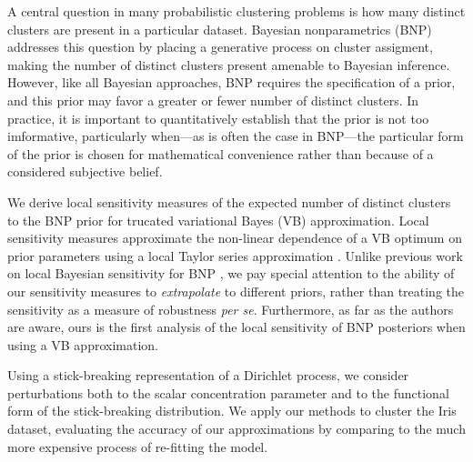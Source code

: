 
A central question in many probabilistic clustering problems is how many
distinct clusters are present in a particular dataset.
Bayesian nonparametrics (BNP) addresses this question by placing a generative
process on cluster assigment, making the number of distinct clusters present
amenable to Bayesian inference.  However, like all Bayesian approaches, BNP
requires the specification of a prior, and this prior may favor a greater or
fewer number of distinct clusters.
In practice, it is important to quantitatively establish that the prior is
not too imformative, particularly when---as is often the case in BNP---the
particular form of the prior is chosen for mathematical convenience rather than
because of a considered subjective belief.

We derive local sensitivity measures of the expected number of distinct clusters
to the BNP prior for trucated variational Bayes (VB) approximation.  Local
sensitivity measures approximate the non-linear dependence of a VB optimum on
prior parameters using a local Taylor series approximation
\citep{gustafson:1996:localposterior, giordano:2017:covariances}. Unlike
previous work on local Bayesian sensitivity for BNP
\citep{Basu:2000:BNP_robustness}, we pay special attention to the ability of our
sensitivity measures to \emph{extrapolate} to different priors, rather than
treating the sensitivity as a measure of robustness \textit{per se}.
Furthermore, as far as the authors are aware, ours is the first analysis of the
local sensitivity of BNP posteriors when using a VB approximation.


Using a stick-breaking representation of a Dirichlet process, we consider
perturbations both to the scalar concentration parameter and to the functional
form of the stick-breaking distribution. We apply our methods to cluster the
Iris \citep{iris_data_anderson, iris_data_fisher} dataset, evaluating the
accuracy of our approximations by comparing to the much more expensive process
of re-fitting the model.


